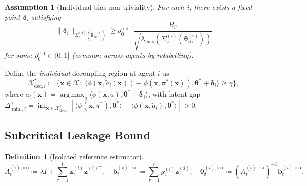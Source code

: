 \documentclass[11pt]{article}
\newtheorem{definition}[theorem]{Definition}
\newtheorem{assumption}[theorem]{Assumption}
\DeclareMathOperator*{\argmax}{arg\,max}
\begin{document}
\begin{assumption}[Individual bias non-triviality]\label{ass:bias_ind}
For each $i$, there exists a fixed point $\bm{\delta}_i$ satisfying
\[
\|\bm{\delta}_i\|_{\Sigma_z^{(i)}(\bm{\theta}_\infty^{(i)})}
\geq\rho_0^{\mathrm{ind}}\cdot
\frac{B_\beta}{\sqrt{\lambda_{\max}(\Sigma_z^{(i)}(\bm{\theta}_\infty^{(i)}))}}
\]
for some $\rho_0^{\mathrm{ind}}\in(0,1]$ (common across agents by
relabelling).
\end{assumption}

Define the \emph{individual} decoupling region at agent $i$ as
\[
\mathcal{X}_{\mathrm{dec},i}^\gamma\coloneqq
\bigl\{\bm{x}\in\mathcal{X}:\;
\langle\phi(\bm{x},\tilde{a}_i(\bm{x}))-\phi(\bm{x},\pi^{\!*}(\bm{x})),
\bm{\theta}^{\!*}+\bm{\delta}_i\rangle\geq\gamma\bigr\},
\]
where $\tilde{a}_i(\bm{x})=\argmax_a\langle\phi(\bm{x},a),\bm{\theta}^{\!*}+\bm{\delta}_i\rangle$,
with latent gap
$\Delta_{\min,i}^\gamma=\inf_{\bm{x}\in\mathcal{X}_{\mathrm{dec},i}^\gamma}
[\langle\phi(\bm{x},\pi^{\!*}),\bm{\theta}^{\!*}\rangle
-\langle\phi(\bm{x},\tilde{a}_i),\bm{\theta}^{\!*}\rangle]>0$.

\subsection{Subcritical Leakage Bound}

\begin{definition}[Isolated reference estimator]
\[
A_t^{(i),\mathrm{iso}}\coloneqq\lambda I+\sum_{\tau=1}^t
\bm{z}_\tau^{(i)}\bm{z}_\tau^{(i)\top},\quad
\bm{b}_t^{(i),\mathrm{iso}}\coloneqq\sum_{\tau=1}^t
y_\tau^{(i)}\bm{z}_\tau^{(i)},\quad
\bm{\theta}_t^{(i),\mathrm{iso}}\coloneqq(A_t^{(i),\mathrm{iso}})^{-1}
\bm{b}_t^{(i),\mathrm{iso}}.
\]
\end{definition}
\end{document}
